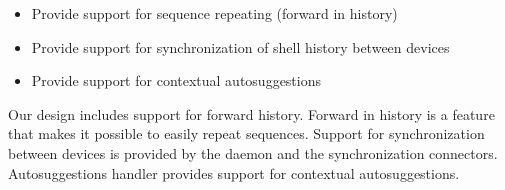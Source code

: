 \begin{itemize}
    \item Provide support for sequence repeating (forward in history)
    \item Provide support for synchronization of shell history between devices
    \item Provide support for contextual autosuggestions
\end{itemize}
Our design includes support for forward history. Forward in history is a feature that makes it possible to easily repeat sequences. 
Support for synchronization between devices is provided by the daemon and the synchronization connectors. Autosuggestions handler provides support for contextual autosuggestions.
 